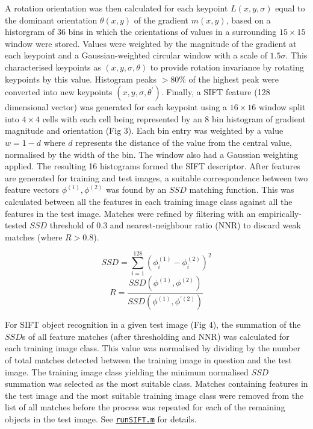 \documentclass[11pt]{article}
\begin{document}
\begin{multicols}{2}
A rotation orientation was then calculated for each keypoint $L(x,y,\sigma)$ equal to the dominant orientation $\theta(x,y)$ of the gradient $m(x,y)$, based on a historgram of 36 bins in which the orientations of values in a surrounding $15\times15$ window were stored. Values were weighted by the magnitude of the gradient at each keypoint and a Gaussian-weighted circular window with a scale of $1.5\sigma$. This characterised keypoints as $(x,y,\sigma,\theta)$ to provide rotation invariance by rotating keypoints by this value. Histogram peaks $>80\%$ of the highest peak were converted into new keypoints $(x,y,\sigma,\theta^{'})$. Finally, a SIFT feature (128 dimensional vector) was generated for each keypoint using a $16\times16$ window split into $4\times4$ cells with each cell being represented by an 8 bin histogram of gradient magnitude and orientation (Fig 3). Each bin entry was weighted by a value $w=1-d$ where $d$ represents the distance of the value from the central value, normalised by the width of the bin. The window also had a Gaussian weighting applied. The resulting 16 histograms formed the SIFT descriptor. After features are generated for training and test images, a suitable correspondence between two feature vectors $\phi^{(1)}, \phi^{(2)}$ was found by an $SSD$ matching function. This was calculated between all the features in each training image class against all the features in the test image. Matches were refined by filtering with an empirically-tested $SSD$ threshold of $0.3$ and nearest-neighbour ratio (NNR) to discard weak matches (where $R>0.8$).

\setlength\multicolsep{0pt}
\setlength\abovedisplayskip{0pt}
\setlength\belowdisplayskip{0pt}
\begin{multicols}{2}
\begin{equation*}
SSD=\sum_{i=1}^{128}(\phi_i^{(1)}-\phi_i^{(2)})^2
\end{equation*}\break
\begin{equation*}
R=\dfrac{SSD(\phi^{(1)},\phi^{(2)})}{SSD(\phi^{(1)},\phi^{'(2)})}
\end{equation*}
\end{multicols}

For SIFT object recognition in a given test image (Fig 4), the summation of the $SSD$s of all feature matches (after thresholding and NNR) was calculated for each training image class. This value was normalised by dividing by the number of total matches detected between the training image in question and the test image. The training image class yielding the minimum normalised $SSD$ summation was selected as the most suitable class. Matches containing features in the test image and the most suitable training image class were removed from the list of all matches before the process was repeated for each of the remaining objects in the test image. See \texttt{\hyperlink{runSIFT.m}{runSIFT.m}} for details.


\end{multicols}
\end{document}
